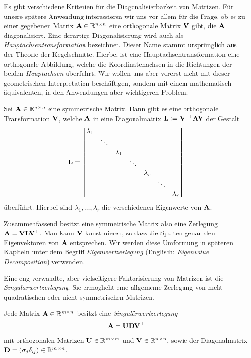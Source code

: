 Es gibt verschiedene Kriterien für die Diagonalisierbarkeit von Matrizen. Für unsere spätere Anwendung interessieren wir uns vor allem für die Frage, ob es zu einer gegebenen Matrix $\mathbf{A} \in \mathbb{R}^{n \times n}$ eine orthogonale Matrix $\mathbf{V}$ gibt, die $\mathbf{A}$ diagonalisiert. Eine derartige Diagonalisierung wird auch als \textit{Hauptachsentransformation} bezeichnet. Dieser Name stammt ursprünglich aus der Theorie der Kegelschnitte. Hierbei ist eine Hauptachsentransformation eine orthogonale Abbildung, welche die Koordinatenachsen in die Richtungen der beiden \textit{Hauptachsen} überführt. Wir wollen uns aber vorerst nicht mit dieser geometrischen Interpretation beschäftigen, sondern mit einem mathematisch äquivalenten, in den Anwendungen aber wichtigeren Problem.

\begin{thm}
Sei $\mathbf{A} \in \mathbb{R}^{n \times n}$ eine symmetrische Matrix. Dann gibt es eine orthogonale Transformation $\mathbf{V}$, welche $\mathbf{A}$ in eine Diagonalmatrix $\mathbf{L} \vcentcolon= \mathbf{V}^{-1}\mathbf{A}\mathbf{V}$ der Gestalt
$$\mathbf{L} = \begin{bmatrix}
    \lambda_{1} & & & & & & \\
    & \ddots & & & & & \\
    & & \lambda_1 & & & & \\
    & & & \ddots & & & \\
    & & & &\lambda_r & & \\
    & & & & & \ddots & \\
    & & & & & & \lambda_{r}
  \end{bmatrix}$$
überführt. Hierbei sind $\lambda_1, \ldots, \lambda_r$ die verschiedenen Eigenwerte von $\mathbf{A}$.
\end{thm}

Zusammenfassend besitzt eine symmetrische Matrix also eine Zerlegung $\mathbf{A} = \mathbf{V} \mathbf{L} \mathbf{V}^{\top}$. Man kann $\mathbf{V}$ konstruieren, so dass die Spalten genau den Eigenvektoren von $\mathbf{A}$ entsprechen. Wir werden diese Umformung in späteren Kapiteln unter dem Begriff \textit{Eigenwertzerlegung} (Englisch: \textit{Eigenvalue Decomposition}) verwenden. 

Eine eng verwandte, aber vielseitigere Faktorisierung von Matrizen ist die \textit{Singulärwertzerlegung}. Sie ermöglicht eine allgemeine Zerlegung von nicht quadratischen oder nicht symmetrischen Matrizen.

\begin{thm}
Jede Matrix $\mathbf{A} \in \mathbb{R}^{m \times n}$ besitzt eine \textit{Singulärwertzerlegung} 
$$\mathbf{A} = \mathbf{U}\mathbf{D}\mathbf{V}^{\top}$$
mit orthogonalen Matrizen $\mathbf{U} \in \mathbb{R}^{m \times m}$ und $\mathbf{V} \in \mathbb{R}^{n \times n}$, sowie der Diagonalmatrix $\mathbf{D} = (\sigma_j\delta_{ij}) \in \mathbb{R}^{m \times n}$.
\end{thm}

